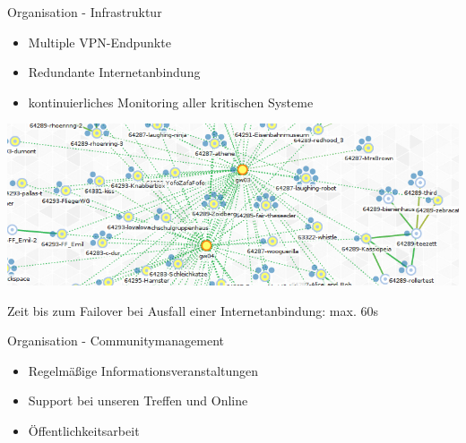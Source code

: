\documentclass{beamer}
\begin{document}
\begin{frame}{Organisation - Infrastruktur}
\vfill
\begin{itemize}
	\item Multiple VPN-Endpunkte
	\item Redundante Internetanbindung
	\item kontinuierliches Monitoring aller kritischen Systeme
\end{itemize}
\begin{center}
\includegraphics[width=\textwidth]{images/ffmap_graph}
\end{center}
\vfill
Zeit bis zum Failover bei Ausfall einer Internetanbindung: max. 60s
\vfill
\end{frame}


	
\begin{frame}{Organisation - Communitymanagement}
\vfill
\begin{itemize}
\item Regelmäßige Informationsveranstaltungen
\item Support bei unseren Treffen und Online
\item Öffentlichkeitsarbeit
\end{itemize}
\vfill
\end{frame}
\end{document}

